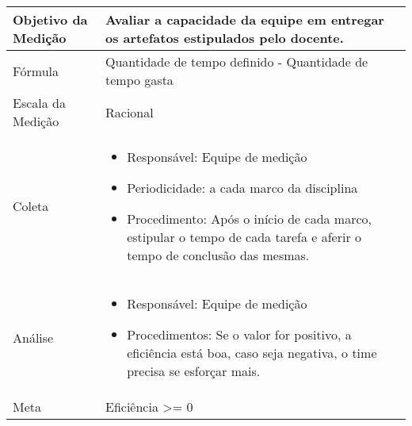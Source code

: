 	\begin{tabular}{ |p{4cm}|p{8cm}|  }
	 \hline
	 Objetivo da Medição 		&  	 Avaliar a capacidade da equipe em entregar os artefatos estipulados pelo docente.  \\ %
	 \hline
	 Fórmula		& 	Quantidade de tempo definido - Quantidade de tempo gasta	\\
	 \hline
	 Escala da Medição 		& 	Racional	 \\
	 \hline
	 Coleta		& 	\begin{itemize} \item Responsável: Equipe de medição \item Periodicidade: a cada marco da disciplina \item Procedimento: Após o início de cada marco, estipular o tempo de cada tarefa e aferir o tempo de conclusão das mesmas. \end{itemize}	\\
	 \hline
	 Análise		& 	\begin{itemize} \item Responsável: Equipe de medição \item Procedimentos: Se o valor for positivo, a eficiência está boa, caso seja negativa, o time precisa se esforçar mais. \end{itemize}	 \\
	 \hline
	 Meta		& 	Eficiência >= 0	 \\
	 \hline
	\end{tabular}



